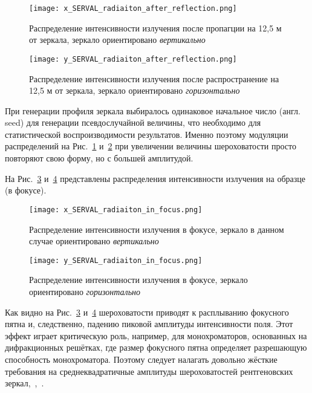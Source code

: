 \begin{figure}[H] 
	\centering 	\texttt{[image: x\_SERVAL\_radiaiton\_after\_reflection.png]}
	\caption{Распределение интенсивности излучения после пропагции на 12,5 м от зеркала, зеркало ориентировано \textit{вертикально}}
	\label{fig:x_SERVAL_radiaiton_after_reflection}
\end{figure}

\begin{figure}[H] 
	\centering 	\texttt{[image: y\_SERVAL\_radiaiton\_after\_reflection.png]}
	\caption{Распределение интенсивности излучения после распространение на 12,5 м от зеркала, зеркало ориентировано \textit{горизонтально}}
	\label{fig:y_SERVAL_radiaiton_after_reflection}
\end{figure}
\noindent При генерации профиля зеркала выбиралось одинаковое начальное число (англ. seed) для генерации псевдослучайной величины, что необходимо для статистической воспроизводимости результатов. Именно поэтому модуляции распределений на Рис.~\ref{fig:x_SERVAL_radiaiton_after_reflection} и~\ref{fig:y_SERVAL_radiaiton_after_reflection} при увеличении величины шероховатости просто повторяют свою форму, но с большей амплитудой.

На Рис.~\ref{fig:x_SERVAL_radiaiton_in_focus} и~\ref{fig:y_SERVAL_radiaiton_in_focus} представлены распределения интенсивности излучения на образце (в фокусе).
\begin{figure}[H] 
	\centering 	\texttt{[image: x\_SERVAL\_radiaiton\_in\_focus.png]}
	\caption{Распределение интенсивности излучения в фокусе, зеркало в данном случае ориентировано \textit{вертикально}}
	\label{fig:x_SERVAL_radiaiton_in_focus}
\end{figure}

\begin{figure}[H] 
	\centering 	\texttt{[image: y\_SERVAL\_radiaiton\_in\_focus.png]}
	\caption{Распределение интенсивности излучения в фокусе, зеркало ориентировано \textit{горизонтально}}
	\label{fig:y_SERVAL_radiaiton_in_focus}
\end{figure}

Как видно на Рис.~\ref{fig:x_SERVAL_radiaiton_in_focus} и~\ref{fig:y_SERVAL_radiaiton_in_focus} шероховатости приводят к расплыванию фокусного пятна и, следственно, падению пиковой амплитуды интенсивности поля. Этот эффект играет критическую роль, например, для монохроматоров, основанных на дифракционных решётках, где размер фокусного пятна определяет разрешающую способность монохроматора. Поэтому следует налагать довольно жёсткие требования на среднеквадратичные амплитуды шероховатостей рентгеновских зеркал,~\cite{strocov_high-resolution_2010},~\cite{sankari_hippie_nodate}. 

